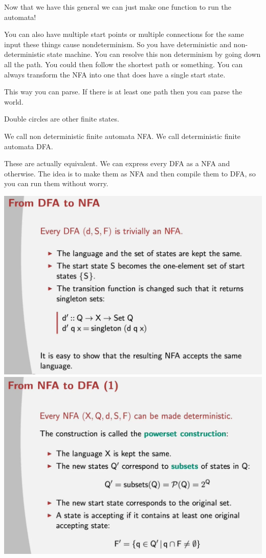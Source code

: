 \documentclass[
  11pt,
  british,
]{article}
\begin{document}
Now that we have this general we can just make one function to run the
automata!

You can also have multiple start points or multiple connections for the
same input these things cause nondeterminism. So you have deterministic
and non-deterministic state machine. You can resolve this non
determinism by going down all the path. You could then follow the
shortest path or something. You can always transform the NFA into one
that does have a single start state.

This way you can parse. If there is at least one path then you can parse
the world.

Double circles are other finite states.

We call non deterministic finite automata NFA. We call deterministic
finite automata DFA.

These are actually equivalent. We can express every DFA as a NFA and
otherwise. The idea is to make them as NFA and then compile them to DFA,
so you can run them without worry.

\includegraphics{Pasted_image_20211212165403.png}
\includegraphics{Pasted_image_20211212165450.png}
\end{document}
